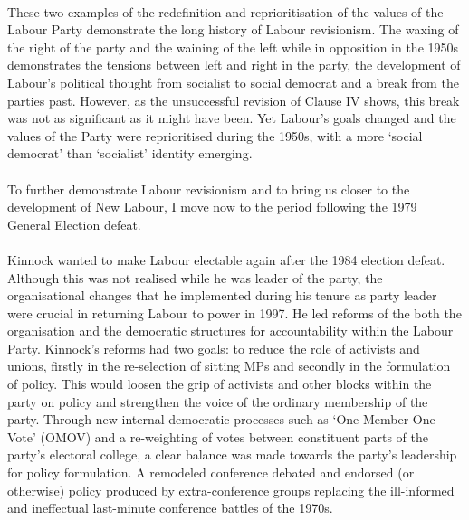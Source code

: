 \documentclass[13pt]{article}
\begin{document}
\begin{onehalfspace}
\paragraph{}These two examples of the redefinition and reprioritisation of the values of the Labour Party demonstrate the long history of Labour revisionism. The waxing of the right of the party and the waining of the left while in opposition in the 1950s demonstrates the tensions between left and right in the party, the development of Labour's political thought from socialist to social democrat and a break from the parties past. However, as the unsuccessful revision of Clause IV shows, this break was not as significant as it might have been. Yet Labour's goals changed and the values of the Party were reprioritised during the 1950s, with a more `social democrat' than `socialist' identity emerging.

\paragraph{}To further demonstrate Labour revisionism and to bring us closer to the development of New Labour, I move now to the period following the 1979 General Election defeat.

\paragraph{}Kinnock wanted to make Labour electable again after the 1984 election defeat. Although this was not realised while he was leader of the party, the organisational changes that he implemented during his tenure as party leader were crucial in returning Labour to power in 1997. He led reforms of the both the organisation and the democratic structures for accountability within the Labour Party. Kinnock's reforms had two goals: to reduce the role of activists and unions, firstly in the re-selection of sitting MPs and secondly in the formulation of policy. This would loosen the grip of activists and other blocks within the party on policy and strengthen the voice of the ordinary membership of the party. Through new internal democratic processes such as `One Member One Vote' (OMOV) and a re-weighting of votes between constituent parts of the party's electoral college, a clear balance was made towards the party's leadership for policy formulation. A remodeled conference debated and endorsed (or otherwise) policy produced by extra-conference groups replacing the ill-informed and ineffectual last-minute conference battles of the 1970s.


\end{onehalfspace}
\end{document}
